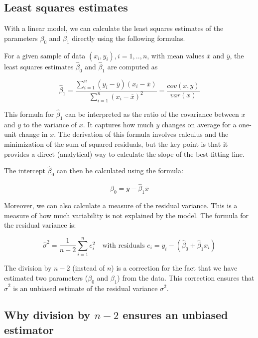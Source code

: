 \documentclass[
  letterpaper,
  8pt,
  a4paper]{book}
\begin{document}
\subsection*{Least squares estimates}\label{least-squares-estimates}

With a linear model, we can calculate the least squares estimates of the
parameters \(\beta_0\) and \(\beta_1\) directly using the following
formulas.

For a given sample of data \((x_i,y_i), i=1,..,n\), with mean values
\(\overline{x}\) and \(\overline{y}\), the least squares estimates
\(\hat\beta_0\) and \(\hat\beta_1\) are computed as

\[ \hat\beta_1 = \frac{\sum_{i=1}^n  (y_i - \overline{y}) (x_i - \overline{x})}{ \sum_{i=1}^n (x_i - \overline{x})^2 } = \frac{cov(x,y)}{var(x)}\]

This formula for \(\hat\beta_1\) can be interpreted as the ratio of the
covariance between \(x\) and \(y\) to the variance of \(x\). It captures
how much \(y\) changes on average for a one-unit change in \(x\). The
derivation of this formula involves calculus and the minimization of the
sum of squared residuals, but the key point is that it provides a direct
(analytical) way to calculate the slope of the best-fitting line.

The intercept \(\hat\beta_0\) can then be calculated using the formula:

\[\hat\beta_0 = \overline{y} - \hat\beta_1 \overline{x}  \]

Moreover, we can also calculate a measure of the residual variance. This
is a measure of how much variability is not explained by the model. The
formula for the residual variance is:

\[ \hat\sigma^2 = \frac{1}{n-2}\sum_{i=1}^n e_i^2 \quad \text{with residuals  } e_i = y_i - (\hat\beta_0 + \hat\beta_1 x_i) \]

The division by \(n-2\) (instead of \(n\)) is a correction for the fact
that we have estimated two parameters (\(\beta_0\) and \(\beta_1\)) from
the data. This correction ensures that \(\hat\sigma^2\) is an unbiased
estimate of the residual variance \(\sigma^2\).

\subsection*{\texorpdfstring{Why division by \(n-2\) ensures an unbiased
estimator}{Why division by n-2 ensures an unbiased estimator}}\label{why-division-by-n-2-ensures-an-unbiased-estimator}
\end{document}
